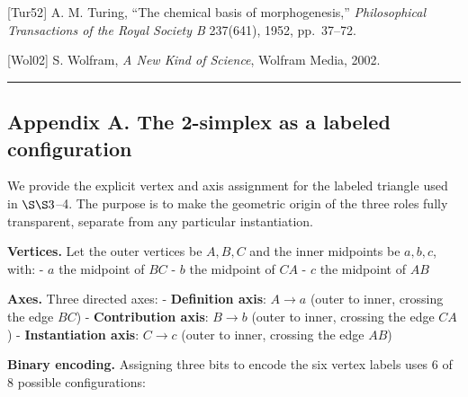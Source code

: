 \documentclass[
  11pt,
  letterpaper,
]{article}
\begin{document}
{[}Tur52{]} A. M. Turing, ``The chemical basis of morphogenesis,''
\emph{Philosophical Transactions of the Royal Society B} 237(641), 1952,
pp.~37--72.

{[}Wol02{]} S. Wolfram, \emph{A New Kind of Science}, Wolfram Media,
2002.

\begin{center}\rule{0.5\linewidth}{0.5pt}\end{center}

\subsection{Appendix A. The 2-simplex as a labeled
configuration}\label{appendix-a.-the-2-simplex-as-a-labeled-configuration}

We provide the explicit vertex and axis assignment for the labeled
triangle used in \(\S\S 3\)--4. The purpose is to make the geometric
origin of the three roles fully transparent, separate from any
particular instantiation.

\textbf{Vertices.} Let the outer vertices be \(A, B, C\) and the inner
midpoints be \(a, b, c\), with: - \(a\) the midpoint of \(BC\) - \(b\)
the midpoint of \(CA\) - \(c\) the midpoint of \(AB\)

\textbf{Axes.} Three directed axes: - \textbf{Definition axis}:
\(A \to a\) (outer to inner, crossing the edge \(BC\)) -
\textbf{Contribution axis}: \(B \to b\) (outer to inner, crossing the
edge \(CA\)) - \textbf{Instantiation axis}: \(C \to c\) (outer to inner,
crossing the edge \(AB\))

\textbf{Binary encoding.} Assigning three bits to encode the six vertex
labels uses 6 of 8 possible configurations:
\end{document}
